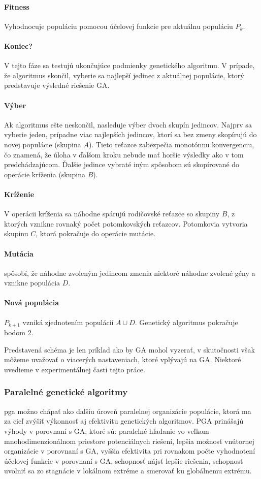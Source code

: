 \paragraph{Fitness} Vyhodnocuje populáciu pomocou účelovej funkcie pre aktuálnu populáciu $ P_k $.
\paragraph{Koniec?} V tejto fáze sa testujú ukončujúce podmienky genetického algoritmu.
V prípade, že algoritmus skončil, vyberie sa najlepší jedinec z aktuálnej populácie, ktorý predstavuje výsledné riešenie GA.
\paragraph{Výber} Ak algoritmus ešte neskončil, nasleduje výber dvoch skupín jedincov. Najprv sa vyberie jeden, prípadne viac najlepších jedincov, ktorí sa bez zmeny skopírujú
do novej populácie (skupina $ A $). Tieto reťazce zabezpečia monotónnu konvergenciu, čo znamená, že úloha v ďalšom kroku nebude mať horšie výsledky ako v tom predchádzajúcom.
Ďalšie jedince vybraté iným spôsobom sú skopírované do operácie kríženia (skupina $ B $).
\paragraph{Kríženie} V operácii kríženia sa náhodne spárujú rodičovské reťazce so skupiny $ B $, z ktorých vznikne rovnaký počet potomkovských reťazcov.
Potomkovia vytvoria skupinu $ C $, ktorá pokračuje do operácie mutácie. 
\paragraph{Mutácia} spôsobí, že náhodne zvoleným jedincom zmenia niektoré náhodne zvolené gény a vznikne populácia $ D $.
\paragraph{Nová populácia} $ P_{k+1} $ vzniká zjednotením populácií $ A \cup D $. Genetický algoritmus pokračuje bodom 2.
  
Predstavená schéma je len príklad ako by GA mohol vyzerať, v skutočnosti však môžeme uvažovať o viacerých nastaveniach, ktoré vplývajú na GA.
Niektoré uvedieme v experimentálnej časti tejto práce.

\subsubsection{Paralelné genetické algoritmy}
\acrfull{pga} možno chápať ako ďalšiu úroveň paralelnej organizácie populácie, ktorá ma za cieľ zvýšiť výkonnosť aj efektivitu genetických algoritmov.
PGA prinášajú výhody v porovnaní s GA, ktoré sú: paralelné hľadanie vo veľkom mnohodimenzionálnom priestore potenciálnych riešení, lepšia možnosť vnútornej organizácie v porovnaní s GA, vyššia efektivita pri rovnakom počte vyhodnotení účelovej funkcie v porovnaní s GA, schopnosť nájsť lepšie riešenia, schopnosť uvolniť sa zo stagnácie v lokálnom extréme a smerovať ku globálnemu extrému. \cite{pea}

